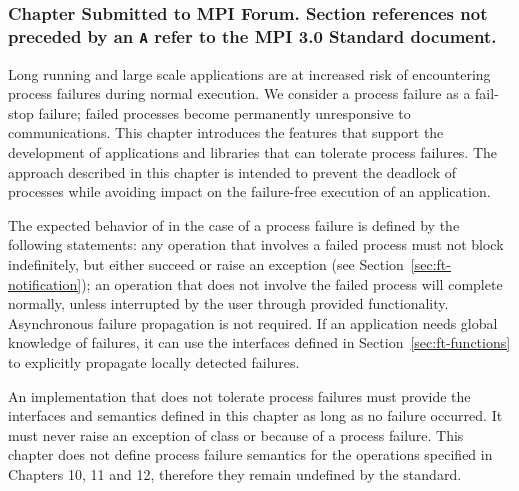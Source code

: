 %
%
%

\renewcommand*\descriptionlabel[1]{\hspace\labelsep\it #1}

\label{chap:ft}
\subsubsection*{Chapter Submitted to MPI Forum. Section references not preceded by an \texttt{A} refer to the MPI 3.0 Standard document.}

\label{sec:ft-intro}

Long running and large scale applications are at increased risk of encountering
process failures during normal execution. We consider a
process failure as a fail-stop failure; failed processes become permanently
unresponsive to communications.  This chapter introduces the \mpi features
that support the development of applications and libraries that can tolerate
process failures.  The approach described in this chapter is intended to prevent
the deadlock of processes while avoiding impact on the failure-free execution of
an application.

The expected behavior of \mpi in the case of a process failure is defined
by the following statements: any \mpi operation that involves a failed process
must not block indefinitely, but either succeed or raise an \mpi exception (see
Section~\ref{sec:ft-notification}); an \mpi operation that does not involve the
failed process will complete normally, unless interrupted by the user through
provided functionality. Asynchronous failure propagation is not required. If an
application needs global knowledge of failures, it can use the interfaces
defined in Section~\ref{sec:ft-functions} to explicitly propagate locally
detected failures.  

An implementation that does not tolerate process failures must provide the
interfaces and semantics defined in this chapter as long as no failure 
occurred. It must never raise an exception of class 
 or 
because of a process failure.
This chapter does not define process failure semantics for the operations
specified in Chapters 10, 11 and 12, therefore they remain undefined by the \mpi standard.


